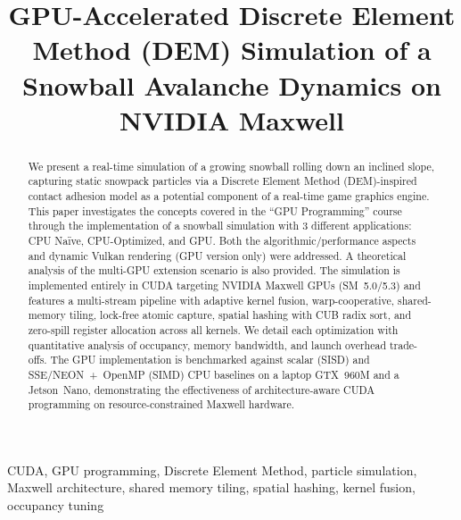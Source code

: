 \documentclass[conference]{IEEEtran}
\begin{document}
\title{GPU-Accelerated Discrete Element Method (DEM) Simulation of a Snowball Avalanche Dynamics on NVIDIA Maxwell}

\author{
}

\maketitle

\begin{abstract}
We present a real-time simulation of a growing snowball rolling down an inclined slope, capturing static snowpack particles via a Discrete Element Method (DEM)-inspired contact adhesion model as a potential component of a real-time game graphics engine.
This paper investigates the concepts covered in the “GPU Programming” course through the implementation of a snowball simulation with 3 different applications: CPU Naïve, CPU-Optimized, and GPU.
Both the algorithmic/performance aspects and dynamic Vulkan rendering (GPU version only) were addressed.
A theoretical analysis of the multi-GPU extension scenario is also provided.
The simulation is implemented entirely in CUDA targeting NVIDIA Maxwell GPUs (SM~5.0/5.3) and features a multi-stream pipeline with adaptive kernel fusion, warp-cooperative, shared-memory tiling, lock-free atomic capture, spatial hashing with CUB radix sort, and zero-spill register allocation across all kernels.
We detail each optimization with quantitative analysis of occupancy, memory bandwidth, and launch overhead trade-offs.
The GPU implementation is benchmarked against scalar (SISD) and SSE/NEON~+~OpenMP (SIMD) CPU baselines on a laptop GTX~960M and a Jetson~Nano, demonstrating the effectiveness of architecture-aware CUDA programming on resource-constrained Maxwell hardware.
\end{abstract}

\begin{IEEEkeywords}
CUDA, GPU programming, Discrete Element Method, particle simulation, Maxwell architecture, shared memory tiling, spatial hashing, kernel fusion, occupancy tuning
\end{IEEEkeywords}









\end{document}
